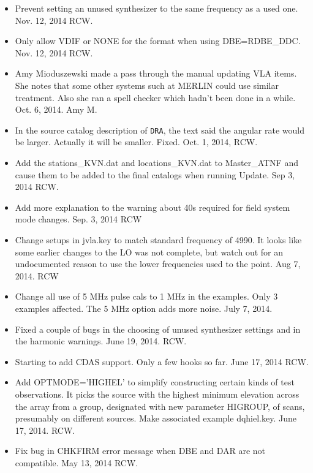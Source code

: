 \documentclass{report}
\begin{document}
\begin{itemize}
\item Prevent setting an unused synthesizer to the same frequency
as a used one.  Nov. 12, 2014  RCW.

\item Only allow VDIF or NONE for the format when using DBE=RDBE\_DDC.
Nov. 12, 2014  RCW.

\item Amy Mioduszewski made a pass through the manual updating VLA
items.  She notes that some other systems such at MERLIN could use
similar treatment.  Also she ran a spell checker which hadn't been
done in a while.  Oct. 6, 2014.  Amy M.

\item In the source catalog description of {\tt DRA}, the text said
the angular rate would be larger.  Actually it will be smaller.
Fixed.  Oct. 1, 2014, RCW.

\item Add the stations\_KVN.dat and locations\_KVN.dat to
Master\_ATNF and
cause them to be added to the final catalogs when running Update.  Sep
3, 2014  RCW.

\item Add more explanation to the warning about 40s required for field
system mode changes.  Sep. 3, 2014  RCW

\item Change setups in jvla.key to match standard frequency of 4990.  It
looks like some earlier changes to the LO was not complete, but watch
out for an undocumented reason to use the lower frequencies used to the 
point.  Aug 7, 2014.  RCW

\item Change all use of 5 MHz pulse cals to 1 MHz in the examples.
Only 3 examples affected.  The 5 MHz option adds more noise.
July 7, 2014.

\item Fixed a couple of bugs in the choosing of unused synthesizer 
settings and in the harmonic warnings.  June 19, 2014.  RCW.

\item Starting to add CDAS support.  Only a few hooks so far. 
June 17, 2014  RCW.

\item Add OPTMODE='HIGHEL' to simplify constructing certain kinds of
test observations.  It picks the source with the highest minimum elevation
across the array from a group, designated with new parameter HIGROUP,
of scans, presumably on different sources.  Make associated
example dqhiel.key.  June 17, 2014.  RCW.

\item Fix bug in CHKFIRM error message when DBE and DAR are not compatible.
May 13, 2014  RCW.

\end{itemize}
\end{document}

